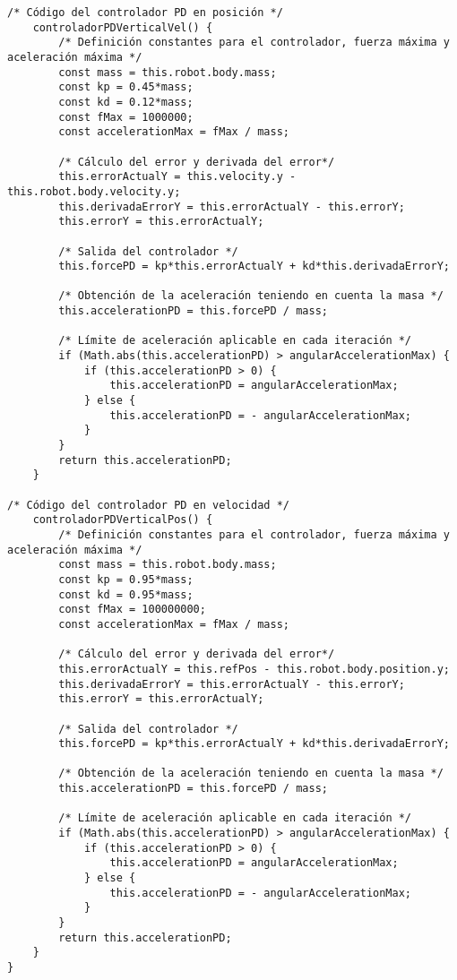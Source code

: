 \footnotesize {
\begin{verbatim}
/* Código del controlador PD en posición */
    controladorPDVerticalVel() {
        /* Definición constantes para el controlador, fuerza máxima y                   aceleración máxima */
        const mass = this.robot.body.mass;
        const kp = 0.45*mass;
        const kd = 0.12*mass;
        const fMax = 1000000;
        const accelerationMax = fMax / mass;

        /* Cálculo del error y derivada del error*/
        this.errorActualY = this.velocity.y - this.robot.body.velocity.y; 
        this.derivadaErrorY = this.errorActualY - this.errorY;
        this.errorY = this.errorActualY;
        
        /* Salida del controlador */
        this.forcePD = kp*this.errorActualY + kd*this.derivadaErrorY;
        
        /* Obtención de la aceleración teniendo en cuenta la masa */
        this.accelerationPD = this.forcePD / mass;

        /* Límite de aceleración aplicable en cada iteración */
        if (Math.abs(this.accelerationPD) > angularAccelerationMax) {
            if (this.accelerationPD > 0) {
                this.accelerationPD = angularAccelerationMax;
            } else {
                this.accelerationPD = - angularAccelerationMax;
            }
        }
        return this.accelerationPD;
    }
    
/* Código del controlador PD en velocidad */
    controladorPDVerticalPos() {
        /* Definición constantes para el controlador, fuerza máxima y                   aceleración máxima */
        const mass = this.robot.body.mass;
        const kp = 0.95*mass;
        const kd = 0.95*mass;
        const fMax = 100000000;
        const accelerationMax = fMax / mass;

        /* Cálculo del error y derivada del error*/
        this.errorActualY = this.refPos - this.robot.body.position.y;
        this.derivadaErrorY = this.errorActualY - this.errorY;
        this.errorY = this.errorActualY;
        
        /* Salida del controlador */
        this.forcePD = kp*this.errorActualY + kd*this.derivadaErrorY;
        
        /* Obtención de la aceleración teniendo en cuenta la masa */
        this.accelerationPD = this.forcePD / mass;

        /* Límite de aceleración aplicable en cada iteración */
        if (Math.abs(this.accelerationPD) > angularAccelerationMax) {
            if (this.accelerationPD > 0) {
                this.accelerationPD = angularAccelerationMax;
            } else {
                this.accelerationPD = - angularAccelerationMax;
            }
        }
        return this.accelerationPD;
    }
}
\end{verbatim}
}

